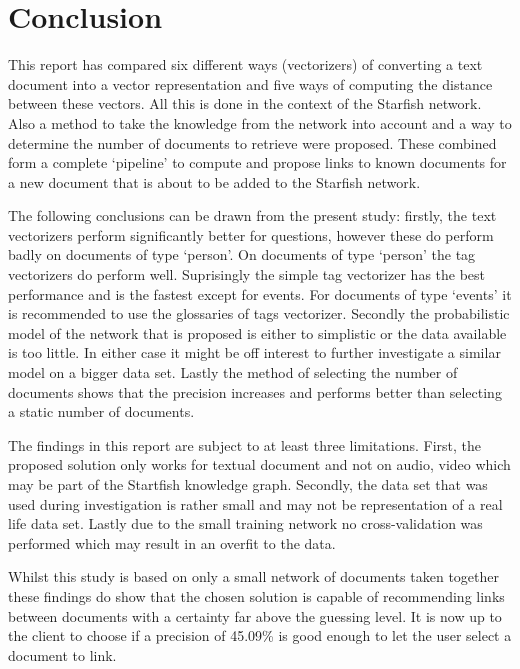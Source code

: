 \section{Conclusion}
This report has compared six different ways (vectorizers) of converting a text
document into a vector representation and five ways of computing the distance
between these vectors. All this is done in the context of the Starfish network.
Also a method to take the knowledge from the network into account and a way to
determine the number of documents to retrieve were proposed. These combined
form a complete `pipeline' to compute and propose links to known documents for
a new document that is about to be added to the Starfish network.

The following conclusions can be drawn from the present study: firstly, the
text vectorizers perform significantly better for questions, however these do
perform badly on documents of type `person'. On documents of type `person' the
tag vectorizers do perform well. Suprisingly the simple tag vectorizer has the
best performance and is the fastest except for events. For documents of type
`events' it is recommended to use the glossaries of tags vectorizer.  Secondly
the probabilistic model of the network that is proposed is either to simplistic
or the data available is too little. In either case it might be off interest to
further investigate a similar model on a bigger data set. Lastly the method
of selecting the number of documents shows that the precision increases and
performs better than selecting a static number of documents.

The findings in this report are subject to at least three limitations. First,
the proposed solution only works for textual document and not on audio, video
which may be part of the Startfish knowledge graph. Secondly, the data set
that was used during investigation is rather small and may not be representation
of a real life data set. Lastly due to the small training network no cross-validation
was performed which may result in an overfit to the data.

Whilst this study is based on only a small network of documents taken together
these findings do show that the chosen solution is capable of recommending
links between documents with a certainty far above the guessing level. It is
now up to the client to choose if a precision of 45.09\% is good enough to
let the user select a document to link.

